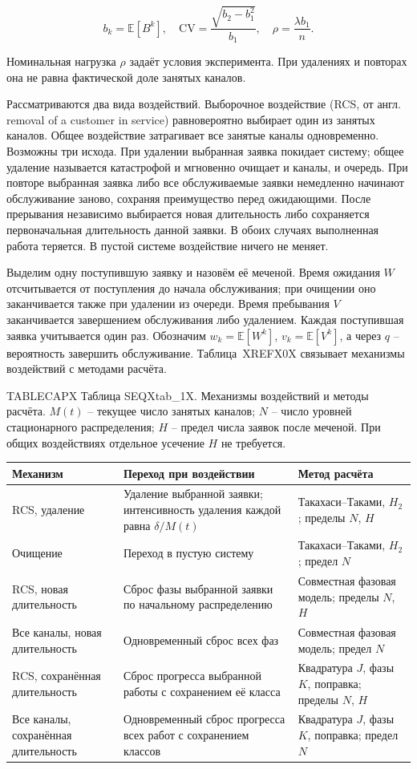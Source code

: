 \[b_k=\mathbb E[B^k],\quad \mathrm{CV}=\frac{\sqrt{b_2-b_1^2}}{b_1},\quad \rho=\frac{\lambda b_1}{n}.\]


Номинальная нагрузка \(\rho\) задаёт условия эксперимента. При удалениях и повторах она не равна фактической доле занятых каналов.

Рассматриваются два вида воздействий. Выборочное воздействие (RCS, от англ. removal of a customer in service) равновероятно выбирает один из занятых каналов. Общее воздействие затрагивает все занятые каналы одновременно. Возможны три исхода. При удалении выбранная заявка покидает систему; общее удаление называется катастрофой и мгновенно очищает и каналы, и очередь. При повторе выбранная заявка либо все обслуживаемые заявки немедленно начинают обслуживание заново, сохраняя преимущество перед ожидающими. После прерывания независимо выбирается новая длительность либо сохраняется первоначальная длительность данной заявки. В обоих случаях выполненная работа теряется. В пустой системе воздействие ничего не меняет.

Выделим одну поступившую заявку и назовём её меченой. Время ожидания \(W\) отсчитывается от поступления до начала обслуживания; при очищении оно заканчивается также при удалении из очереди. Время пребывания \(V\) заканчивается завершением обслуживания либо удалением. Каждая поступившая заявка учитывается один раз. Обозначим \(w_k=\mathbb E[W^k]\), \(v_k=\mathbb E[V^k]\), а через \(q\) -- вероятность завершить обслуживание. Таблица~XREFX0X связывает механизмы воздействий с методами расчёта.

\noindent TABLECAPX Таблица SEQXtab_1X. Механизмы воздействий и методы расчёта. \(M(t)\) -- текущее число занятых каналов; \(N\) -- число уровней стационарного распределения; \(H\) -- предел числа заявок после меченой. При общих воздействиях отдельное усечение \(H\) не требуется.\par


\begin{tabular}{p{3.6cm}p{6.0cm}p{5.0cm}}
\toprule
Механизм & Переход при воздействии & Метод расчёта \\
\midrule
RCS, удаление & Удаление выбранной заявки; интенсивность удаления каждой равна \(\delta/M(t)\) & Такахаси--Таками, \(H_2\); пределы \(N\), \(H\) \\
Очищение & Переход в пустую систему & Такахаси--Таками, \(H_2\); предел \(N\) \\
RCS, новая длительность & Сброс фазы выбранной заявки по начальному распределению & Совместная фазовая модель; пределы \(N\), \(H\) \\
Все каналы, новая длительность & Одновременный сброс всех фаз & Совместная фазовая модель; предел \(N\) \\
RCS, сохранённая длительность & Сброс прогресса выбранной работы с сохранением её класса & Квадратура \(J\), фазы \(K\), поправка; пределы \(N\), \(H\) \\
Все каналы, сохранённая длительность & Одновременный сброс прогресса всех работ с сохранением классов & Квадратура \(J\), фазы \(K\), поправка; предел \(N\) \\
\bottomrule
\end{tabular}




